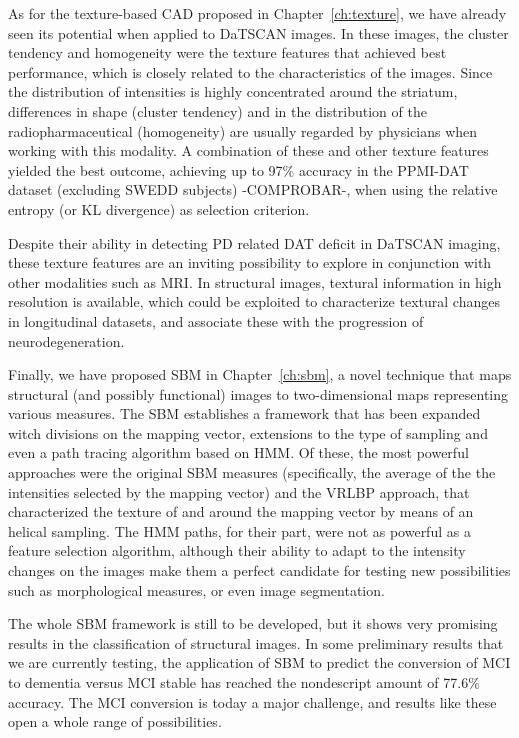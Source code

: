 As for the texture-based \ac{CAD} proposed in Chapter~\ref{ch:texture}, we have already seen its potential when applied to DaTSCAN images. In these images, the cluster tendency and homogeneity were the texture features that achieved best performance, which is closely related to the characteristics of the images. Since the distribution of intensities is highly concentrated around the striatum, differences in shape (cluster tendency) and in the distribution of the radiopharmaceutical (homogeneity) are usually regarded by physicians when working with this modality. A combination of these and other texture features yielded the best outcome, achieving up to 97\% accuracy in the PPMI-DAT dataset (excluding \ac{SWEDD} subjects) -COMPROBAR-, when using the relative entropy (or \ac{KL} divergence) as selection criterion. 

Despite their ability in detecting \ac{PD} related \ac{DAT} deficit in DaTSCAN imaging, these texture features are an inviting possibility to explore in conjunction with other modalities such as \ac{MRI}. In structural images, textural information in high resolution is available, which could be exploited to characterize textural changes in longitudinal datasets, and associate these with the progression of neurodegeneration. 

Finally, we have proposed \ac{SBM} in Chapter~\ref{ch:sbm}, a novel technique that maps structural (and possibly functional) images to two-dimensional maps representing various measures. The \ac{SBM} establishes a framework that has been expanded witch divisions on the mapping vector, extensions to the type of sampling and even a path tracing algorithm based on \ac{HMM}. Of these, the most powerful approaches were the original \ac{SBM} measures (specifically, the average of the the intensities selected by the mapping vector) and the \ac{VRLBP} approach, that characterized the texture of and around the mapping vector by means of an helical sampling. The \ac{HMM} paths, for their part, were not as powerful as a feature selection algorithm, although their ability to adapt to the intensity changes on the images make them a perfect candidate for testing new possibilities such as morphological measures, or even image segmentation. 

The whole \ac{SBM} framework is still to be developed, but it shows very promising results in the classification of structural images. In some preliminary results that we are currently testing, the application of \ac{SBM} to predict the conversion of \ac{MCI} to dementia versus \ac{MCI} stable has reached the nondescript amount of 77.6\% accuracy. The \ac{MCI} conversion is today a major challenge, and results like these open a whole range of possibilities. 

